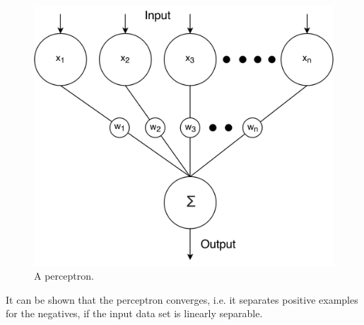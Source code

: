 \begin{figure}[H]
	\centering
	\includegraphics[width=\columnwidth]{./img/perceptron}
	\caption{A perceptron.}
	\label{fig:1:perceptron}
\end{figure}

It can be shown that the perceptron converges, i.e. it separates positive examples for the negatives, if the input data set is linearly separable. 



